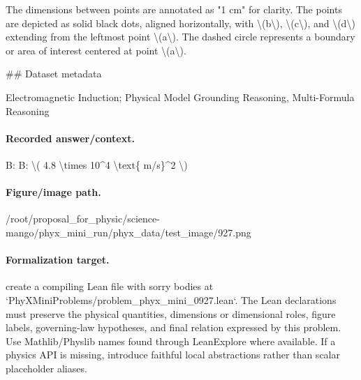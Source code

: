The dimensions between points are annotated as "1 cm" for clarity. The points are depicted as solid black dots, aligned horizontally, with \textbackslash{}(b\textbackslash{}), \textbackslash{}(c\textbackslash{}), and \textbackslash{}(d\textbackslash{}) extending from the leftmost point \textbackslash{}(a\textbackslash{}). The dashed circle represents a boundary or area of interest centered at point \textbackslash{}(a\textbackslash{}).

\#\# Dataset metadata

Electromagnetic Induction; Physical Model Grounding Reasoning, Multi-Formula Reasoning

\paragraph{Recorded answer/context.}
B: B: \textbackslash{}( 4.8 \textbackslash{}times 10\textasciicircum{}4 \textbackslash{}text\{ m/s\}\textasciicircum{}2 \textbackslash{})

\paragraph{Figure/image path.}
/root/proposal\_for\_physic/science-mango/phyx\_mini\_run/phyx\_data/test\_image/927.png

\paragraph{Formalization target.}
create a compiling Lean file with sorry bodies at `PhyXMiniProblems/problem\_phyx\_mini\_0927.lean`. The Lean declarations must preserve the physical quantities, dimensions or dimensional roles, figure labels, governing-law hypotheses, and final relation expressed by this problem.
Use Mathlib/Physlib names found through LeanExplore where available. If a physics API is missing, introduce faithful local abstractions rather than scalar placeholder aliases.

